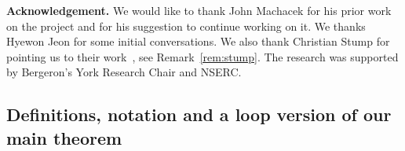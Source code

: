\documentclass[10pt,a4paper]{article}
\begin{document}
\medskip
\noindent
\textbf{Acknowledgement.} We would like to thank John Machacek for his prior work on the project and for his suggestion to continue working on it. We thanks Hyewon Jeon for  some initial conversations.
We also thank Christian Stump for pointing us to their work~\cite{ESS}, see Remark~\ref{rem:stump}. The research was supported by Bergeron's York Research Chair and NSERC.


\subsection{ \label{background} Definitions, notation and a loop version of our main theorem}
\end{document}
